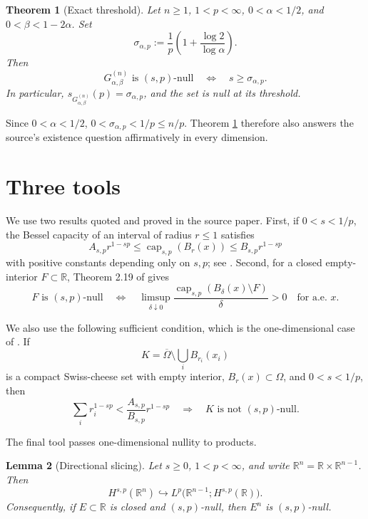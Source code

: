 \documentclass[11pt]{article}
\newtheorem{theorem}{Theorem}
\newtheorem{lemma}[theorem]{Lemma}
\newcommand{\R}{\mathbb R}
\newcommand{\bcap}{\operatorname{cap}}
\begin{document}
\begin{theorem}[Exact threshold]\label{thm:main}
Let $n\geq1$, $1<p<\infty$, $0<\alpha<1/2$, and
$0<\beta<1-2\alpha$.  Set
\begin{equation}\label{eq:s0}
 \sigma_{\alpha,p}:=
 \frac1p\left(1+\frac{\log2}{\log\alpha}\right).
\end{equation}
Then
\[
 G_{\alpha,\beta}^{(n)}\text{ is $(s,p)$-null}
 \quad\Longleftrightarrow\quad s\geq\sigma_{\alpha,p}.
\]
In particular,
$s_{G_{\alpha,\beta}^{(n)}}(p)=\sigma_{\alpha,p}$, and the set is null at
its threshold.
\end{theorem}

Since $0<\alpha<1/2$,
$0<\sigma_{\alpha,p}<1/p\leq n/p$.  Theorem \ref{thm:main} therefore also
answers the source's existence question affirmatively in every dimension.

\section{Three tools}

We use two results quoted and proved in the source paper.  First, if
$0<s<1/p$, the Bessel capacity of an interval of radius $r\leq1$ satisfies
\begin{equation}\label{eq:ball-capacity}
 A_{s,p}r^{1-sp}\leq \bcap_{s,p}(B_r(x))
 \leq B_{s,p}r^{1-sp}
\end{equation}
with positive constants depending only on $s,p$; see
\cite[Proposition 3.16]{HM}.  Second, for a closed empty-interior
$F\subset\R$, Theorem 2.19 of \cite{HM} gives
\begin{equation}\label{eq:density-criterion}
 F\text{ is $(s,p)$-null}
 \quad\Longleftrightarrow\quad
 \limsup_{\delta\downarrow0}
 \frac{\bcap_{s,p}(B_\delta(x)\setminus F)}{\delta}>0
 \quad\text{for a.e. }x.
\end{equation}

We also use the following sufficient condition, which is the one-dimensional
case of \cite[Theorem 4.6]{HM}.  If
\[
 K=\overline\Omega\setminus\bigcup_i B_{r_i}(x_i)
\]
is a compact Swiss-cheese set with empty interior, $B_r(x)\subset\Omega$,
and $0<s<1/p$, then
\begin{equation}\label{eq:swiss}
 \sum_i r_i^{1-sp}<\frac{A_{s,p}}{B_{s,p}}r^{1-sp}
 \quad\Longrightarrow\quad K\text{ is not $(s,p)$-null}.
\end{equation}

The final tool passes one-dimensional nullity to products.

\begin{lemma}[Directional slicing]\label{lem:slicing}
Let $s\geq0$, $1<p<\infty$, and write
$\R^n=\R\times\R^{n-1}$.  Then
\begin{equation}\label{eq:slicing}
 H^{s,p}(\R^n)\hookrightarrow
 L^p\bigl(\R^{n-1};H^{s,p}(\R)\bigr).
\end{equation}
Consequently, if $E\subset\R$ is closed and $(s,p)$-null, then
$E^n$ is $(s,p)$-null.
\end{lemma}
\end{document}
